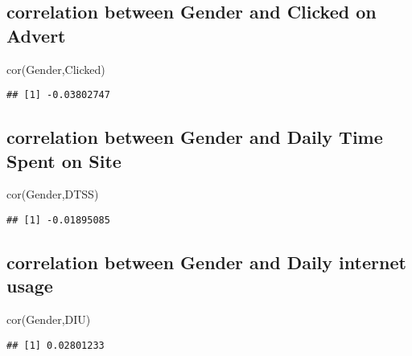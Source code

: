 \documentclass[
]{article}
\newenvironment{Shaded}{\begin{snugshade}}{\end{snugshade}}
\newcommand{\FunctionTok}[1]{\textcolor[rgb]{0.00,0.00,0.00}{#1}}
\newcommand{\NormalTok}[1]{#1}
\begin{document}
\hypertarget{correlation-between-gender-and-clicked-on-advert}{%
\subsection{correlation between Gender and Clicked on
Advert}\label{correlation-between-gender-and-clicked-on-advert}}

\begin{Shaded}
\begin{Highlighting}[]
\FunctionTok{cor}\NormalTok{(Gender,Clicked)}
\end{Highlighting}
\end{Shaded}

\begin{verbatim}
## [1] -0.03802747
\end{verbatim}

\hypertarget{correlation-between-gender-and-daily-time-spent-on-site}{%
\subsection{correlation between Gender and Daily Time Spent on
Site}\label{correlation-between-gender-and-daily-time-spent-on-site}}

\begin{Shaded}
\begin{Highlighting}[]
\FunctionTok{cor}\NormalTok{(Gender,DTSS)}
\end{Highlighting}
\end{Shaded}

\begin{verbatim}
## [1] -0.01895085
\end{verbatim}

\hypertarget{correlation-between-gender-and-daily-internet-usage}{%
\subsection{correlation between Gender and Daily internet
usage}\label{correlation-between-gender-and-daily-internet-usage}}

\begin{Shaded}
\begin{Highlighting}[]
\FunctionTok{cor}\NormalTok{(Gender,DIU)}
\end{Highlighting}
\end{Shaded}

\begin{verbatim}
## [1] 0.02801233
\end{verbatim}
\end{document}
